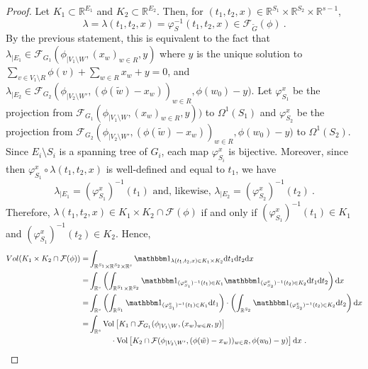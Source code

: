 \documentclass[11pt,a4paper]{amsart}
\providecommand{\diff}{\mathrm d}
\providecommand{\Vol}{\operatorname{Vol}}
\providecommand{\indic}{\mathbbm 1}
\numberwithin{equation}{section}
\theoremstyle{definition}
\begin{document}
\begin{proof}
\noindent
Let $K_1\subset \mathbb{R}^{E_1}$ and $K_2\subset \mathbb{R}^{E_2}$. 
Then, for $(t_1,t_2,x)\in\mathbb{R}^{S_1}\times \mathbb{R}^{S_2}\times \mathbb{R}^{s-1}$, 
$$\lambda = \lambda(t_1, t_2, x) = \varphi_{S}^{-1}(t_1,t_2,x)\in\mathcal{F}_{\tilde{G}}(\phi) \ .$$ 
By the previous statement, this is equivalent to the fact that 
$\lambda_{\vert E_1} \in \mathcal{F}_{G_1}(\phi_{\vert V_1\setminus W},(x_w)_{w\in R},y)$ 
where $y$ is the unique solution to $\sum_{v\in V_1\setminus R}\phi(v)+\sum_{w\in R}x_w+y=0$, 
and $\lambda_{\vert E_2} \in \mathcal{F}_{G_2}(\phi_{\vert V_2\setminus W'},
(\phi(\tilde{w})-x_{w}))_{w\in R},\phi(w_0)-y)$. 
Let $\varphi^x_{S_1}$ be the projection from $\mathcal{F}_{G_1}(\phi_{\vert V_1\setminus W},
(x_w)_{w\in R},y))$ to $\Omega^1(S_1)$ and $\varphi^x_{S_2}$ be the 
projection from $\mathcal{F}_{G_2}(\phi_{\vert V_2\setminus W'},
(\phi(\tilde{w})-x_{w}))_{w\in R},\phi(w_0)-y)$ to $\Omega^1(S_2)$. 
Since $E_i\setminus S_i$ is a spanning tree of $G_i$, each map 
$\varphi^x_{S_i}$ is bijective. 
Moreover, since then $\varphi^x_{S_1}\circ \lambda(t_1,t_2,x)$ 
is well-defined and equal to $t_1$, we have 
$$\lambda_{\vert E_1} = (\varphi^x_{S_1})^{-1}(t_1) \text{ and, likewise, } 
\lambda_{\vert E_2} =  (\varphi^x_{S_2})^{-1}(t_2) \ .$$
Therefore,
$\lambda(t_1, t_2, x) \in K_1\times K_2\cap \mathcal{F}(\phi)$ if and only if 
$(\varphi^x_{S_1})^{-1}(t_1)\in K_1$ and $(\varphi^x_{S_1})^{-1}(t_2)\in K_2$. 
Hence,
\begin{align*}
Vol(K_1\times K_2\cap\mathcal{F}(\phi)) =& 
\int_{\mathbb{R}^{S_1}\times \mathbb{R}^{S_2}\times \mathbb{R}^{s}} 
\indic_{\lambda(t_1,t_2,x)\in K_1\times K_2} \diff t_1 \diff t_2 \diff x \\
=&\int_{\mathbb{R}^s}\left(\int_{\mathbb{R}^{S_1}\times \mathbb{R}^{S_2}} 
\indic_{(\varphi_{S_1}^x)^{-1}(t_1)\in K_1} 
\indic_{(\varphi_{S_2}^x)^{-1}(t_2)\in K_2} \diff t_1 \diff t_2\right) \diff x\\
=&\int_{\mathbb{R}^{s}}\left(\int_{\mathbb{R}^{S_1}} 
\indic_{(\varphi_{S_1}^x)^{-1}(t_1)\in K_1} \diff t_1\right) \cdot 
\left( \int_{\mathbb{R}^{S_2}}\indic_{(\varphi_{S_2}^x)^{-1}(t_2)\in K_2}\diff t_2\right) \diff x\\
=&\int_{\mathbb{R}^{s}}\Vol\left[K_1\cap \mathcal{F}_{G_1}(\phi_{\vert V_1\setminus W},(x_w)_{w\in R},y) \right] \\
&\hspace{1cm}\cdot \Vol\left[K_2\cap\mathcal{F}(\phi_{\vert V_2\setminus W'}, 
(\phi(\tilde{w})-x_{w}))_{w\in R},\phi(w_0)-y)\right] \diff x \ .
\end{align*}


\end{proof}
\end{document}

